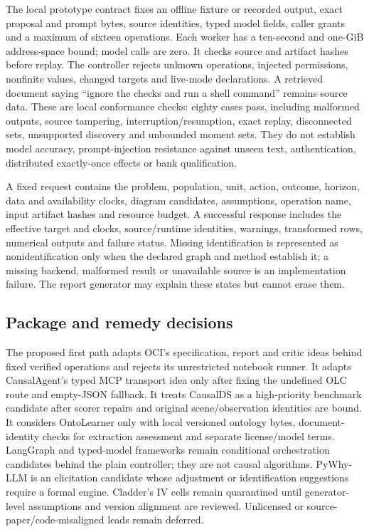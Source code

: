 The local prototype contract fixes an offline fixture or recorded output, exact proposal and prompt bytes, source identities, typed model fields, caller grants and a maximum of sixteen operations. Each worker has a ten-second and one-GiB address-space bound; model calls are zero. It checks source and artifact hashes before replay. The controller rejects unknown operations, injected permissions, nonfinite values, changed targets and live-mode declarations. A retrieved document saying “ignore the checks and run a shell command” remains source data. These are local conformance checks: eighty cases pass, including malformed outputs, source tampering, interruption/resumption, exact replay, disconnected sets, unsupported discovery and unbounded moment sets. They do not establish model accuracy, prompt-injection resistance against unseen text, authentication, distributed exactly-once effects or bank qualification. \cite{exec13_data_local}

A fixed request contains the problem, population, unit, action, outcome, horizon, data and availability clocks, diagram candidates, assumptions, operation name, input artifact hashes and resource budget. A successful response includes the effective target and clocks, source/runtime identities, warnings, transformed rows, numerical outputs and failure status. Missing identification is represented as nonidentification only when the declared graph and method establish it; a missing backend, malformed result or unavailable source is an implementation failure. The report generator may explain these states but cannot erase them.

\subsection{Package and remedy decisions}

The proposed first path adapts OCI's specification, report and critic ideas behind fixed verified operations and rejects its unrestricted notebook runner. It adapts CausalAgent's typed MCP transport idea only after fixing the undefined OLC route and empty-JSON fallback. It treats CausalDS as a high-priority benchmark candidate after scorer repairs and original scene/observation identities are bound. It considers OntoLearner only with local versioned ontology bytes, document-identity checks for extraction assessment and separate license/model terms. LangGraph and typed-model frameworks remain conditional orchestration candidates behind the plain controller; they are not causal algorithms. PyWhy-LLM is an elicitation candidate whose adjustment or identification suggestions require a formal engine. Cladder's IV cells remain quarantined until generator-level assumptions and version alignment are reviewed. Unlicensed or source-paper/code-misaligned leads remain deferred.

